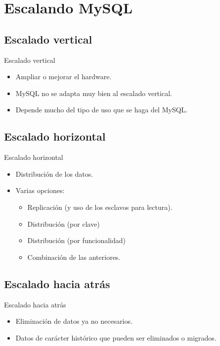 \section{Escalando MySQL}

\subsection{Escalado vertical}
\begin{frame}{Escalado vertical}
  \begin{itemize}
    \item Ampliar o mejorar el hardware.
    \item MySQL no se adapta muy bien al escalado vertical.
    \item Depende mucho del tipo de uso que se haga del MySQL.
  \end{itemize}
\end{frame}

\subsection{Escalado horizontal}
\begin{frame}{Escalado horizontal}
  \begin{itemize}
    \item Distribución de los datos.
    \item Varias opciones:
    \begin{itemize}
      \item Replicación (y uso de los esclavos para lectura).
      \item Distribución (por clave)
      \item Distribución (por funcionalidad)
      \item Combinación de las anteriores.
    \end{itemize}
  \end{itemize}
\end{frame}

\subsection{Escalado hacia atrás}
\begin{frame}{Escalado hacia atrás}
  \begin{itemize}
    \item Eliminación de datos ya no necesarios.
    \item Datos de carácter histórico que pueden ser eliminados o migrados.
  \end{itemize}
\end{frame}

